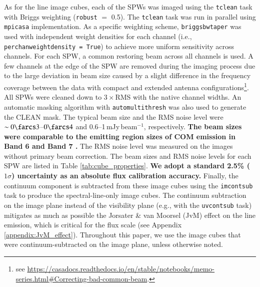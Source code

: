 \documentclass[linenumbers, twocolumn, twocolappendix, astrosymb, times]{aastex631}
\begin{document}
As for the line image cubes, each of the SPWs was imaged using the \texttt{tclean} task \citep{Hogbom1974} with Briggs weighting (\texttt{robust} $=$ 0.5). The \texttt{tclean} task was run in parallel using \texttt{mpicasa} implementation. As a specific weighting scheme, \texttt{briggsbwtaper} was used with independent weight densities for each channel (i.e., \texttt{perchanweightdensity = True}) to achieve more uniform sensitivity across channels. For each SPW, a common restoring beam across all channels is used. A few channels at the edge of the SPW are removed during the imaging process due to the large deviation in beam size caused by a slight difference in the frequency coverage between the data with compact and extended antenna configurations\footnote{see \url{https://casadocs.readthedocs.io/en/stable/notebooks/memo-series.html\#Correcting-bad-common-beam}.}. All SPWs were cleaned down to 3\,$\times$\,RMS with the native channel widths. An automatic masking algorithm with \texttt{automultithresh} was also used to generate the CLEAN mask. The typical beam size and the RMS noise level were $\sim0\farcs3$--$0\farcs4$ and 0.6--1\,mJy\,beam$^{-1}$, respectively. \textbf{The beam sizes were comparable to the emitting region sizes of COM emission in Band 6 and Band 7 \citep{Lee2019, Tobin2023}.} The RMS noise level was measured on the images without primary beam correction. The beam sizes and RMS noise levels for each SPW are listed in Table \ref{tab:cube_properties}. \textbf{We adopt a standard 2.5\% ($1\sigma$) uncertainty as an absolute flux calibration accuracy.}  Finally, the continuum component is subtracted from these image cubes using the \texttt{imcontsub} task to produce the spectral-line-only image cubes. The continuum subtraction on the image plane instead of the visibility plane (e.g., with the \texttt{uvcontsub} task) mitigates as much as possible the Jorsater \& van Moorsel (JvM) effect \citep{JvM, Czekala2021} on the line emission, which is critical for the flux scale (see Appendix \ref{appendix:JvM_effect}). Throughout this paper, we use the image cubes that were continuum-subtracted on the image plane, unless otherwise noted.

\textbf{}
\end{document}

